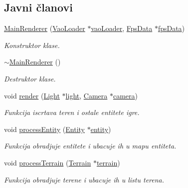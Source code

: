 \subsection*{Javni članovi}
\begin{DoxyCompactItemize}
\item 
\hyperlink{classcore_1_1MainRenderer_abe5c50d41cd58c1c89f290ffffae78dc}{Main\+Renderer} (\hyperlink{classcore_1_1VaoLoader}{Vao\+Loader} $\ast$\hyperlink{namespacecore_a78dd24784c415d3759a0f71b8f4f9f81}{vao\+Loader}, \hyperlink{classutility_1_1FpsData}{Fps\+Data} $\ast$\hyperlink{classcore_1_1MainRenderer_a0ea0659ecfb85286fb5f2bb1d8dc1be1}{fps\+Data})
\begin{DoxyCompactList}\small\item\em Konstruktor klase. \end{DoxyCompactList}\item 
\hyperlink{classcore_1_1MainRenderer_a1e5f39d2178a7c5738efa9be9bd486da}{$\sim$\+Main\+Renderer} ()
\begin{DoxyCompactList}\small\item\em Destruktor klase. \end{DoxyCompactList}\item 
void \hyperlink{classcore_1_1MainRenderer_a3a8f4927df78f7b0ea7c4e5902569b1e}{render} (\hyperlink{classentity_1_1Light}{Light} $\ast$\hyperlink{namespacecore_a2324d96000e7c6d42570a0577e8f070b}{light}, \hyperlink{classentity_1_1Camera}{Camera} $\ast$\hyperlink{namespacecore_a9d645c490b142886301256f6cf9c65c2}{camera})
\begin{DoxyCompactList}\small\item\em Funkcija iscrtava teren i ostale entitete igre. \end{DoxyCompactList}\item 
void \hyperlink{classcore_1_1MainRenderer_ae5ffaef40e727ab758d7b2d36ed4e92a}{process\+Entity} (\hyperlink{classentity_1_1Entity}{Entity} $\ast$\hyperlink{namespacecore_aa710c0ea388433d2d80d1d1c67582eda}{entity})
\begin{DoxyCompactList}\small\item\em Funkcija obradjuje entitete i ubacuje ih u mapu entiteta. \end{DoxyCompactList}\item 
void \hyperlink{classcore_1_1MainRenderer_a4e8a3e6729a7d948761d6e74c48a6236}{process\+Terrain} (\hyperlink{classterrain_1_1Terrain}{Terrain} $\ast$\hyperlink{namespacecore_ac45da6f80dac9bead5c9310c27897f15}{terrain})
\begin{DoxyCompactList}\small\item\em Funkcija obradjuje terene i ubacuje ih u listu terena. \end{DoxyCompactList}\item 

\end{DoxyCompactItemize}
